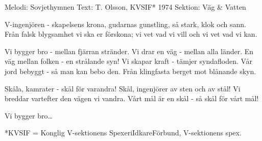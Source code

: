 \begin{song}

\begin{songmeta}
Melodi: Sovjethymnen
Text: T. Olsson, KVSIF* 1974
Sektion: Väg \& Vatten
\end{songmeta}

\begin{songtext}
V-ingenjören - skapelsens krona,
gudarnas gunstling, så stark, klok och sann.
Från falsk blygsamhet vi ska er förskona;
vi vet vad vi vill och vi vet vad vi kan.

Vi bygger bro - mellan fjärran stränder.
Vi drar en väg - mellan alla länder.
En väg mellan folken - en strålande syn!
Vi skapar kraft - tämjer syndafloden.
Vår jord bebyggt - så man kan bebo den.
Från klingfasta berget mot blånande skyn.

Skåla, kamrater - skål för varandra!
Skål, ingenjörer av sten och av stål!
Vi breddar vartefter den vägen vi vandra.
Vårt mål är en skål - så skål för vårt mål!

Vi bygger bro\ldots
\end{songtext}

\begin{songnotes}
*KVSIF = Konglig V-sektionens SpexeriIdkareFörbund, V-sektionens spex.
\end{songnotes}

\end{song}
